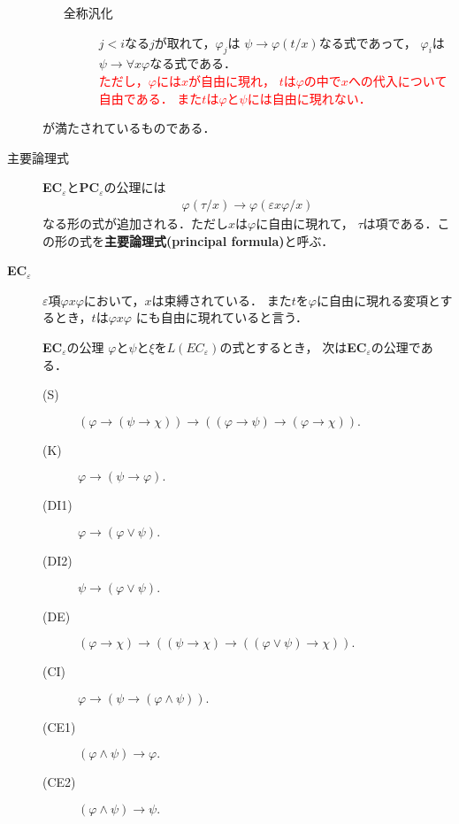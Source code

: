 \begin{description}
\begin{itemize}
\begin{description}
			\item[全称汎化] 
				$j < i$なる$j$が取れて，$\varphi_{j}$は
				$\psi \rightarrow \varphi(t/x)$なる式であって，
				$\varphi_{i}$は$\psi \rightarrow \forall x \varphi$なる式である．
				\\ \textcolor{red}{ただし，$\varphi$には$x$が自由に現れ，
				$t$は$\varphi$の中で$x$への代入について自由である．
				また$t$は$\varphi$と$\psi$には自由に現れない．}
		\end{description} 
	\end{itemize}
	が満たされているものである．
	
	\item[主要論理式]
	{\bf EC}${}_{\varepsilon}$と{\bf PC}${}_{\varepsilon}$の公理には
	\begin{align}
		\varphi(\tau/x) \rightarrow \varphi(\varepsilon x \varphi/x)
	\end{align}
	なる形の式が追加される．ただし$x$は$\varphi$に自由に現れて，
	$\tau$は項である．この形の式を{\bf 主要論理式}{\bf (principal formula)}と呼ぶ．
	
	\item[{\bf EC}${}_{\varepsilon}$]
	
		$\varepsilon$項$\varphi x \varphi$において，$x$は束縛されている．
		また$t$を$\varphi$に自由に現れる変項とするとき，$t$は$\varphi x \varphi$
		にも自由に現れていると言う．
	
	\begin{itembox}[l]{{\bf EC}${}_{\varepsilon}$の公理}
		$\varphi$と$\psi$と$\xi$を$L(EC_{\varepsilon})$の式とするとき，
		次は{\bf EC}${}_{\varepsilon}$の公理である．
		\begin{description}
			\item[(S)] $(\varphi \rightarrow (\psi \rightarrow \chi)) 
				\rightarrow ((\varphi \rightarrow \psi)
				\rightarrow (\varphi \rightarrow \chi)).$
			\item[(K)] $\varphi \rightarrow (\psi \rightarrow \varphi).$
			\item[(DI1)] $\varphi \rightarrow (\varphi \vee \psi).$
			\item[(DI2)] $\psi \rightarrow (\varphi \vee \psi).$
			\item[(DE)] $(\varphi \rightarrow \chi) \rightarrow 
				((\psi \rightarrow \chi) \rightarrow ((\varphi \vee \psi) \rightarrow \chi)).$
			\item[(CI)] $\varphi \rightarrow (\psi \rightarrow (\varphi \wedge \psi)).$
			\item[(CE1)] $(\varphi \wedge \psi) \rightarrow \varphi.$
			\item[(CE2)] $(\varphi \wedge \psi) \rightarrow \psi.$
				

\end{description}
\end{itembox}
\end{description}
